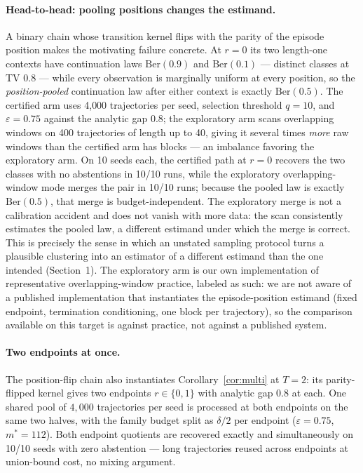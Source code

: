 \documentclass{article}
\newcommand{\eps}{\varepsilon}
\begin{document}
\paragraph{Head-to-head: pooling positions changes the estimand.}
A binary chain whose transition kernel flips with the parity of the episode
position makes the motivating failure concrete.  At $r=0$ its two length-one
contexts have continuation laws $\mathrm{Ber}(0.9)$ and $\mathrm{Ber}(0.1)$
--- distinct classes at TV $0.8$ --- while every observation is marginally
uniform at every position, so the \emph{position-pooled} continuation law
after either context is exactly $\mathrm{Ber}(0.5)$.  The certified arm
uses 4{,}000 trajectories per seed, selection threshold $q=10$, and
$\eps=0.75$ against the analytic gap $0.8$; the exploratory arm scans
overlapping windows on 400 trajectories of length up to 40, giving it
several times \emph{more} raw windows than the certified arm has blocks
--- an imbalance favoring the exploratory arm.  On 10 seeds each, the
certified path at $r=0$ recovers the two classes with no abstentions in
10/10 runs, while the exploratory overlapping-window mode merges the pair
in 10/10 runs; because the pooled law is exactly $\mathrm{Ber}(0.5)$, that
merge is budget-independent.  The exploratory merge is not a calibration accident and
does not vanish with more data: the scan consistently estimates the pooled
law, a different estimand under which the merge is correct.  This is
precisely the sense in which an unstated sampling protocol turns a
plausible clustering into an estimator of a different estimand than the one
intended (Section~1).  The exploratory arm is our own implementation of
representative overlapping-window practice, labeled as such: we are not
aware of a published
implementation that instantiates the episode-position estimand (fixed endpoint,
termination conditioning, one block per trajectory), so the comparison
available on this target is against practice, not against a published
system.

\paragraph{Two endpoints at once.}
The position-flip chain also instantiates Corollary~\ref{cor:multi} at
$T=2$: its parity-flipped kernel gives two endpoints $r\in\{0,1\}$ with
analytic gap $0.8$ at each.  One shared pool of $4{,}000$ trajectories per
seed is processed at both endpoints on the same two halves, with the family
budget split as $\delta/2$ per endpoint ($\eps=0.75$, $m^*=112$).  Both
endpoint quotients are recovered exactly and simultaneously on 10/10 seeds
with zero abstention --- long trajectories reused across endpoints at
union-bound cost, no mixing argument.
\end{document}
